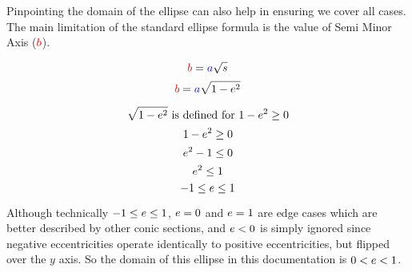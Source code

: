 Pinpointing the domain of the ellipse can also help in ensuring we cover all cases. The main limitation of the standard ellipse formula is the value of Semi Minor Axis ($\textcolor{red}{b}$).

$$\textcolor{red}{b} = \textcolor{blue}{a}\sqrt{\textcolor{black}{s}}$$
$$\textcolor{red}{b} = \textcolor{blue}{a}\sqrt{1-\textcolor{black}{e}^2}$$

$$\sqrt{1-\textcolor{black}{e}^2}\text{  is defined for  } 1-\textcolor{black}{e}^2 \geq 0$$
$$1-\textcolor{black}{e}^2 \geq 0$$
$$\textcolor{black}{e}^2-1 \leq 0$$
$$\textcolor{black}{e}^2 \leq 1$$
$$-1 \leq \textcolor{black}{e} \leq 1$$


Although technically $-1\leq\textcolor{black}{e}\leq1$, $\textcolor{black}{e} = 0$ and $\textcolor{black}{e} = 1$ are edge cases which are better described by other conic sections, and $\textcolor{black}{e} < 0$ is simply ignored since negative eccentricities operate identically to positive eccentricities, but flipped over the $y$ axis. So the domain of this ellipse in this documentation is $0<\textcolor{black}{e}<1$.